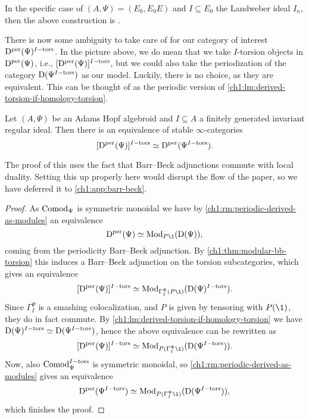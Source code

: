 \begin{remark}
    In the specific case of $(A, \Psi) = (E_0, E_0E)$ and $I\subseteq E_0$ the Landweber ideal $I_n$, then the above construction is \cite[3.12]{barthel-schlank-stapleton_2021}. 
\end{remark}

There is now some ambiguity to take care of for our category of interest $\mathrm{D}^{\mathrm{per}}(\Psi)^{I-\mathrm{tors}}$. In the picture above, we do mean that we take $I$-torsion objects in $\mathrm{D}^{\mathrm{per}}(\Psi)$, i.e., $[\mathrm{D}^{\mathrm{per}}(\Psi)]^{I-\mathrm{tors}}$, but we could also take the periodization of the category $\mathrm{D}(\Psi^{I-\mathrm{tors}})$ as our model. Luckily, there is no choice, as they are equivalent. This can be thought of as the periodic version of \cref{ch1:lm:derived-torsion-if-homology-torsion}.

\begin{theorem}
    \label{ch1:thm:pulling-out-torsion}
    Let $(A, \Psi)$ be an Adams Hopf algebroid and $I\subseteq A$ a finitely generated invariant regular ideal. Then there is an equivalence of stable $\infty$-categories 
    \[[\mathrm{D}^{\mathrm{per}}(\Psi)]^{I-\mathrm{tors}}\simeq \mathrm{D}^{\mathrm{per}}(\Psi^{I-\mathrm{tors}}).\]
\end{theorem}

\begin{remark}
    The proof of this uses the fact that Barr--Beck adjunctions commute with local duality. Setting this up properly here would disrupt the flow of the paper, so we have deferred it to \cref{ch1:app:barr-beck}.
\end{remark} 

\begin{proof}
    As $\mathrm{Comod}_\Psi$ is symmetric monoidal we have by \cref{ch1:rm:periodic-derived-as-modules} an equivalence
    \[\Dper(\Psi)\simeq \Mod_{P\1}(\Der(\Psi)),\]
    coming from the periodicity Barr--Beck adjunction.
    By \cref{ch1:thm:modular-bb-torsion} this induces a Barr--Beck adjunction on the torsion subcategories, which gives an equivalence 
    \[[\Dper(\Psi)]\Itors\simeq \Mod_{\Gamma_I^\Psi (P\1)}(\Der(\Psi)\Itors).\]
    Since $\Gamma_I^\Psi$ is a smashing colocalization, and $P$ is given by tensoring with $P(\1)$, they do in fact commute. By \cref{ch1:lm:derived-torsion-if-homology-torsion} we have $\mathrm{D}(\Psi)^{I-\mathrm{tors}}\simeq \mathrm{D}(\Psi^{I-\mathrm{tors}})$, hence the above equivalence can be rewritten as
    \[[\Dper(\Psi)]\Itors\simeq \Mod_{P(\Gamma_I^\Psi \1)}(\Der(\Psi\Itors)).\]
    Now, also $\mathrm{Comod}_\Psi^{I-\mathrm{tors}}$ is symmetric monoidal, so \cref{ch1:rm:periodic-derived-as-modules} gives an equivalence 
    \[\Dper(\Psi\Itors)\simeq \Mod_{P(\Gamma_I^\Psi\1)}(\Der(\Psi\Itors)),\]which finishes the proof.
\end{proof}

